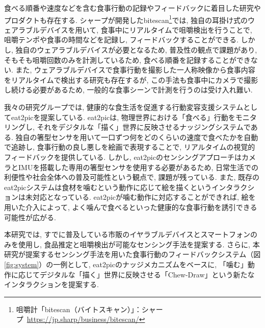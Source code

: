 食べる順番や速度などを含む食事行動の記録やフィードバックに着目した研究やプロダクトも存在する. シャープが開発したbitescan\footnote{咀嚼計「bitescan（バイトスキャン）」：シャープ~\url{https://jp.sharp/business/bitescan/}}では, 独自の耳掛け式のウェアラブルデバイスを用いて, 食事中にリアルタイムで咀嚼検出を行うことで, 咀嚼テンポや食事の時間などを記録し, フィードバックすることができる. しかし, 独自のウェアラブルデバイスが必要となるため, 普及性の観点で課題があり, そもそも咀嚼回数のみを計測しているため, 食べる順番を記録することができない. また, ウェアラブルデバイスで食事行動を撮影した一人称映像から食事内容をリアルタイムで検出する研究も存在するが, この手法も食事中にカメラで撮影し続ける必要があるため, 一般的な食事シーンで計測を行うのは受け入れ難い\cite{10.1145/3551626.3564964}.

我々の研究グループでは, 健康的な食生活を促進する行動変容支援システムとしてeat2picを提案している\cite{10.1145/3580784}. eat2picは, 物理世界における「食べる」行動をモニタリングし, それをデジタルな「描く」世界に反映させるナッジングシステムである. 独自の箸型センサを用いて一口ずつ何をどのくらいの速度で食べたかを自動で追跡し, 食事行動の良し悪しを絵画で表現することで, リアルタイムの視覚的フィードバックを提供している. しかし, eat2picのセンシングアプローチはカメラとIMUを搭載した専用の箸型センサを使用する必要があるため, 日常生活での利便性や社会全体への普及可能性という観点で, 課題が残っている. また, 既存のeat2picシステムは食材を噛むという動作に応じて絵を描くというインタラクションは未対応となっている. eat2picが噛む動作に対応することができれば, 絵を用いた介入によって, よく噛んで食べるといった健康的な食事行動を誘引できる可能性が広がる.

本研究では, すでに普及している市販のイヤラブルデバイスとスマートフォンのみを使用し, 食品推定と咀嚼検出が可能なセンシング手法を提案する. さらに, 本研究が提案するセンシング手法を用いた食事行動のフィードバックシステム（図\ref{fig:system}）の一例として, eat2picのナッジメカニズムをベースに, 「噛む」動作に応じてデジタルな「描く」世界に反映させる「Chew-Draw」という新たなインタラクションを提案する.

